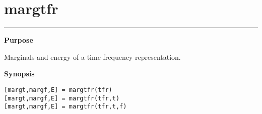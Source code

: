 

\section*{\hspace*{-1.6cm} margtfr}

\vspace*{-.4cm}
\hspace*{-1.6cm}\rule[0in]{16.5cm}{.02cm}
\vspace*{.2cm}



{\bf \large \sf Purpose}\\
\hspace*{1.5cm}
\begin{minipage}[t]{13.5cm}
Marginals and energy of a time-frequency representation.
\end{minipage}
\vspace*{.2cm}

{\bf \large \sf Synopsis}\\
\hspace*{1.5cm}
\begin{minipage}[t]{13.5cm}
\begin{verbatim}
[margt,margf,E] = margtfr(tfr)
[margt,margf,E] = margtfr(tfr,t)
[margt,margf,E] = margtfr(tfr,t,f)
\end{verbatim}
\end{minipage}
\vspace*{.3cm}

